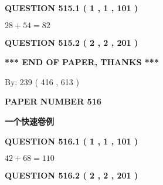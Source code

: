 \documentclass{ctexart}
\begin{document}
   
  
\vspace{0.2in}
  
{\textbf{\Large{QUESTION
515.1 
 ( 1 , 1 , 101 )
}}}
  
  
 
 

$ %
28 +  %
54=   %
82$
 
 
  
\vspace{0.2in}
  
{\textbf{\Large{QUESTION
515.2 
 ( 2 , 2 , 201 )
}}}
  
  
   
   
 \vspace{0.2in}
 
   
   
   
   
\vspace{1.0in} 
{\textbf{\large{ *** END OF PAPER, THANKS *** }}} 
   
   
\hspace{1.0in} By: 
 239 ( 416 ,  613 )
   
   
   
   
\newpage 
\setcounter{page}{ 
   516001 } 
   
   
   
   
 {\textbf{ \Large{ PAPER NUMBER  516  }}}
   
   
\vspace{0.2in}
   
   
   
   
   
   
 \vspace{0.2in}
{\LARGE {\textbf{ 一个快速卷例}}}
   
   
  
\vspace{0.2in}
  
{\textbf{\Large{QUESTION
516.1 
 ( 1 , 1 , 101 )
}}}
  
  
 
 

$ %
42 +  %
68=   %
110$
 
 
  
\vspace{0.2in}
  
{\textbf{\Large{QUESTION
516.2 
 ( 2 , 2 , 201 )
}}}
  
  
   
\end{document}
